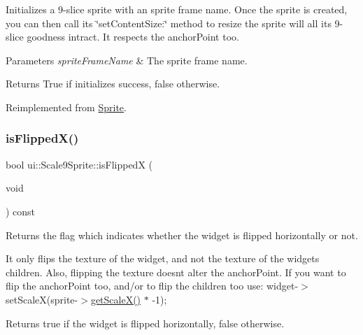 Initializes a 9-\/slice sprite with an sprite frame name. Once the sprite is created, you can then call its \char`\"{}set\+Content\+Size\+:\char`\"{} method to resize the sprite will all it\textquotesingle{}s 9-\/slice goodness intract. It respects the anchor\+Point too.


\begin{DoxyParams}{Parameters}
{\em sprite\+Frame\+Name} & The sprite frame name. \\
\hline
\end{DoxyParams}
\begin{DoxyReturn}{Returns}
True if initializes success, false otherwise. 
\end{DoxyReturn}


Reimplemented from \hyperlink{classSprite_ab30fa40d8c557779a21a2a941c3f18ea}{Sprite}.

\mbox{\label{classui_1_1Scale9Sprite_a0bdf293c9ca00b65d25797602b4d1f58}} 
\subsubsection{\texorpdfstring{is\+Flipped\+X()}{isFlippedX()}}
{\footnotesize\ttfamily bool ui\+::\+Scale9\+Sprite\+::is\+FlippedX (\begin{DoxyParamCaption}\item[{void}]{ }\end{DoxyParamCaption}) const\hspace{0.3cm}{\ttfamily [virtual]}}

Returns the flag which indicates whether the widget is flipped horizontally or not.

It only flips the texture of the widget, and not the texture of the widget\textquotesingle{}s children. Also, flipping the texture doesn\textquotesingle{}t alter the anchor\+Point. If you want to flip the anchor\+Point too, and/or to flip the children too use\+: widget-\/$>$set\+ScaleX(sprite-\/$>$\hyperlink{classui_1_1Scale9Sprite_a3aaed8de223156f4567a4b59e208e66d}{get\+Scale\+X()} $\ast$ -\/1);

\begin{DoxyReturn}{Returns}
true if the widget is flipped horizontally, false otherwise. 
\end{DoxyReturn}
\mbox{\label{classui_1_1Scale9Sprite_a06327e04537085dd71035882807224f1}} 

